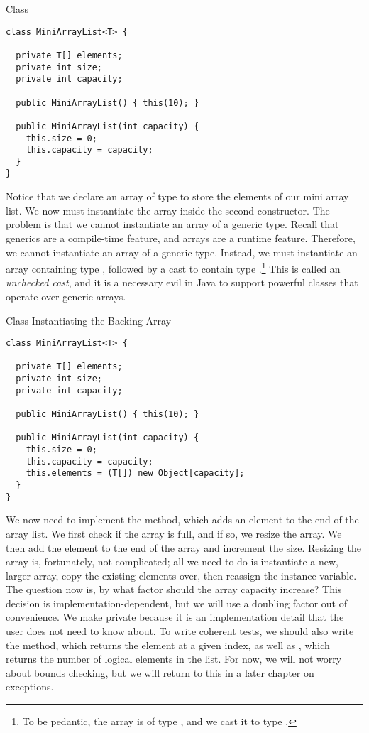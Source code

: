 \begin{cl}[]{ Class}
\begin{lstlisting}[language=MyJava]
class MiniArrayList<T> {

  private T[] elements;
  private int size;
  private int capacity;

  public MiniArrayList() { this(10); }

  public MiniArrayList(int capacity) {
    this.size = 0;
    this.capacity = capacity;
  }
}
\end{lstlisting}
\end{cl}

Notice that we declare an array of type  to store the elements of our mini array list. We now must instantiate the array inside the second constructor. The problem is that we cannot instantiate an array of a generic type. Recall that generics are a compile-time feature, and arrays are a runtime feature. Therefore, we cannot instantiate an array of a generic type. Instead, we must instantiate an array containing type , followed by a cast to contain type .\footnote{To be pedantic, the array is of type , and we cast it to type .} This is called an \textit{unchecked cast}, and it is a necessary evil in Java to support powerful classes that operate over generic arrays.

\begin{cl}[]{ Class Instantiating the Backing Array}
\begin{lstlisting}[language=MyJava]
class MiniArrayList<T> {

  private T[] elements;
  private int size;
  private int capacity;

  public MiniArrayList() { this(10); }

  public MiniArrayList(int capacity) {
    this.size = 0;
    this.capacity = capacity;
    this.elements = (T[]) new Object[capacity];
  }
}
\end{lstlisting}
\end{cl}

We now need to implement the  method, which adds an element to the end of the array list. We first check if the array is full, and if so, we resize the array. We then add the element to the end of the array and increment the size. Resizing the array is, fortunately, not complicated; all we need to do is instantiate a new, larger array, copy the existing elements over, then reassign the instance variable. The question now is, by what factor should the array capacity increase? This decision is implementation-dependent, but we will use a doubling factor out of convenience. We make  private because it is an implementation detail that the user does not need to know about. To write coherent tests, we should also write the  method, which returns the element at a given index, as well as , which returns the number of logical elements in the list. For now, we will not worry about bounds checking, but we will return to this in a later chapter on exceptions.

